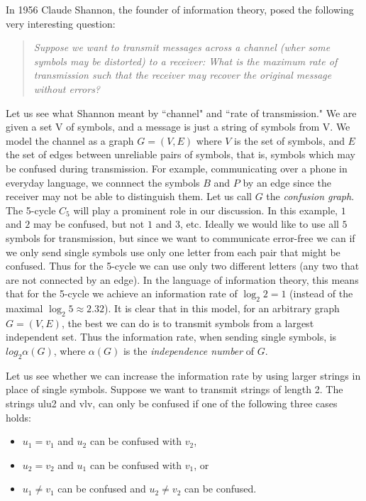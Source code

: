 \documentclass[openany,12pt]{memoir}
\newenvironment{myquote}
{\begin{quotebox}\begin{quote}}
{\end{quote}\end{quotebox}}
\begin{document}
In 1956 Claude Shannon, the founder of information theory, posed the following very interesting question:

\begin{myquote}
\textit{Suppose we want to transmit messages across a channel (wher 
some symbols may be distorted) to a receiver: What is the maximum
rate of transmission such that the receiver may recover the original
message without errors?}
\end{myquote}

Let us see what Shannon meant by ``channel" and ``rate of transmission." 
We are given a set V of symbols, and a message is just a string of symbols 
from V. We model the channel as a graph $G = (V,E)$  where $V$ is the set 
of symbols, and $E$ the set of edges between unreliable pairs of symbols, 
that is, symbols which may be confused during transmission. For example, 
communicating over a phone in everyday language, we connnect the symbols
$B$ and $P$ by an edge since the receiver may not be able to distinguish 
them. Let us call $G$ the \textit{confusion graph}.
The 5-cycle $C_5$ will play a prominent role in our discussion. In this example,
$1$ and $2$ may be confused, but not $1$ and $3$, etc. Ideally we would like 
to use all $5$ symbols for transmission, but since we want to communicate error-free we can 
if we only send single symbols use only one letter from each pair that might
be confused. Thus for the 5-cycle we can use only two different letters
(any two that are not connected by an edge). In the language of information theory,
this means that for the 5-cycle we achieve an information rate of
$\log_2 2 = 1$ (instead of the maximal $\log_2 5 \approx 2.32$). It is clear that in this model,
for an arbitrary graph $G = (V, E)$, the best we can do is to transmit symbols from
a largest independent set. Thus the information rate, when sending single symbols,
is $log_2 \alpha(G)$, where $\alpha(G)$ is the \textit{independence number} of $G$.

Let us see whether we can increase the information rate by using larger 
strings in place of single symbols. Suppose we want to transmit strings of 
length 2. The strings ulu2 and vlv, can only be confused if one of the 
following three cases holds: 

\begin{itemize}[leftmargin=12pt]
  \item $u_1 = v_1$ and $u_2$ can be confused with $v_2$,
  \item $u_2 = v_2$ and $u_1$ can be confused with $v_1$, or
  \item $u_1 \neq v_1$ can be confused and $u_2 \neq v_2$ can be confused. 
\end{itemize}
\end{document}
